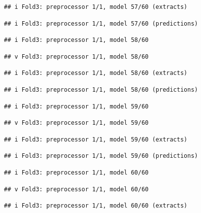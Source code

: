 \documentclass[
]{article}
\begin{document}
\begin{verbatim}
## i Fold3: preprocessor 1/1, model 57/60 (extracts)
\end{verbatim}

\begin{verbatim}
## i Fold3: preprocessor 1/1, model 57/60 (predictions)
\end{verbatim}

\begin{verbatim}
## i Fold3: preprocessor 1/1, model 58/60
\end{verbatim}

\begin{verbatim}
## v Fold3: preprocessor 1/1, model 58/60
\end{verbatim}

\begin{verbatim}
## i Fold3: preprocessor 1/1, model 58/60 (extracts)
\end{verbatim}

\begin{verbatim}
## i Fold3: preprocessor 1/1, model 58/60 (predictions)
\end{verbatim}

\begin{verbatim}
## i Fold3: preprocessor 1/1, model 59/60
\end{verbatim}

\begin{verbatim}
## v Fold3: preprocessor 1/1, model 59/60
\end{verbatim}

\begin{verbatim}
## i Fold3: preprocessor 1/1, model 59/60 (extracts)
\end{verbatim}

\begin{verbatim}
## i Fold3: preprocessor 1/1, model 59/60 (predictions)
\end{verbatim}

\begin{verbatim}
## i Fold3: preprocessor 1/1, model 60/60
\end{verbatim}

\begin{verbatim}
## v Fold3: preprocessor 1/1, model 60/60
\end{verbatim}

\begin{verbatim}
## i Fold3: preprocessor 1/1, model 60/60 (extracts)
\end{verbatim}
\end{document}
